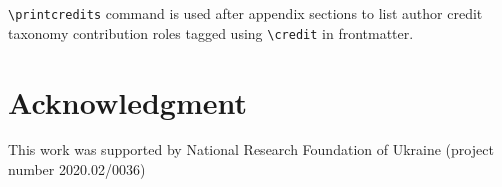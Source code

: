 \documentclass[a4paper,fleqn]{cas-sc}
\begin{document}
\verb+\printcredits+ command is used after appendix sections to list
author credit taxonomy contribution roles tagged using \verb+\credit+
in frontmatter.

\printcredits

\section*{Acknowledgment}

This work was supported by National Research Foundation  of Ukraine
(project number 2020.02/0036)

%

%





%
%
\end{document}
